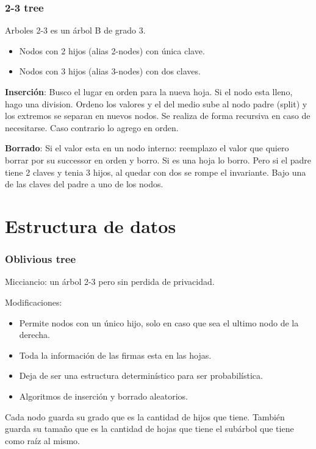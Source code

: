 \documentclass[10pt,handout]{beamer}
\begin{document}
\begin{frame}
\frametitle{2-3 tree}

Arboles 2-3 es un árbol B de grado 3.
\begin{itemize}
  \item Nodos con 2 hijos (alias 2-nodes) con única clave.
  \item Nodos con 3 hijos (alias 3-nodes) con dos claves.
\end{itemize}

\pause
\textbf{Inserción}: Busco el lugar en orden para la nueva hoja. Si el nodo esta lleno, hago una division.
Ordeno los valores y el del medio sube al nodo padre (split) y los extremos se separan en nuevos nodos.
Se realiza de forma recursiva en caso de necesitarse.
Caso contrario lo agrego en orden.

\pause
\textbf{Borrado}: Si el valor esta en un nodo interno: reemplazo el valor que quiero borrar por su
successor en orden y borro.
Si es una hoja lo borro. Pero si el padre tiene 2 claves y tenia 3 hijos, al quedar con dos se rompe el invariante.
Bajo una de las claves del padre a uno de los nodos.
\end{frame}




\section{Estructura de datos}
\begin{frame}
\frametitle{Oblivious tree}

Micciancio: un árbol 2-3 pero sin perdida de privacidad.

Modificaciones:
\begin{itemize}
\pause
  \item Permite nodos con un único hijo, solo en caso que sea el ultimo nodo de la derecha.
  \item Toda la información de las firmas esta en las hojas.
\pause
  \item Deja de ser una estructura determinístico para ser probabilística.
  \item Algoritmos de inserción y borrado aleatorios.
\end{itemize}

\pause
Cada nodo guarda su grado que es la cantidad de hijos que tiene.
También guarda su tamaño que es la cantidad de hojas que tiene el subárbol que tiene como
raíz al mismo.
\end{frame}
\end{document}
